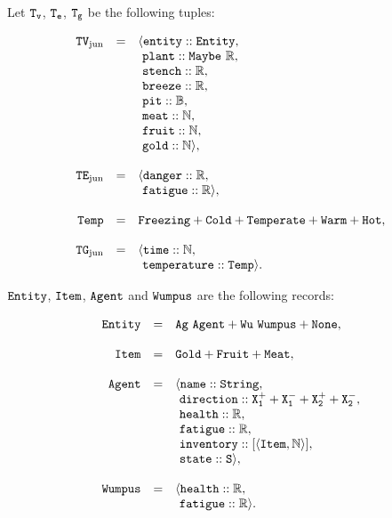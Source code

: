 \begin{definition}[\wjun]
\label{def:wjun}
Let $\mathtt{T_v}$, $\mathtt{T_e}$, $\mathtt{T_g}$ be the following tuples:

$$
	\begin{array}{r c l}
		\type{TV_{\mathrm{jun}}} & = & \langle \field{entity} :: \type{Entity},\\
		           &   & 	   \ \field{plant} :: \type{Maybe\ \R},\\
		           &   &     \ \field{stench} :: \R,\\
		           &   &     \ \field{breeze} :: \R,\\
		           &   &	   \ \field{pit}    :: \B,\\
		           &   &		\ \field{meat}    :: \N,\\
		           &   &		\ \field{fruit}    :: \N,\\
		           &   &	   \ \field{gold}   :: \N \rangle,
		\\
		\\
		\type{TE_{\mathrm{jun}}} & = & \langle \field{danger} :: \R,\\
				   &   &       \ \field{fatigue} :: \R \rangle,
		\\
		\\
		\type{Temp} & = & \type{Freezing} + \type{Cold} + \type{Temperate} + \type{Warm} + \type{Hot},\\
		\\
		\type{TG_{\mathrm{jun}}} & = & \langle \field{time} :: \N,\\
				   &   &       \ \field{temperature} :: \type{Temp} \rangle.
	\end{array}
$$

$\mathtt{Entity}$, $\mathtt{Item}$, $\mathtt{Agent}$ and $\mathtt{Wumpus}$ are the following records:

$$
	\begin{array}{r c l}
		\mathtt{Entity} & = & \mathtt{Ag\ Agent + Wu\ Wumpus + None},\\
		\\
		\mathtt{Item} & = & \mathtt{Gold + Fruit + Meat},\\
		\\
		\mathtt{Agent} & = & \langle \mathtt{name} :: \mathtt{String},\\ 
					 &   & \ \mathtt{direction} :: \mathtt{X_1^+ + X_1^- + X_2^+ + X_2^-},\\
					 &   & \ \mathtt{health} :: \mathbb{R},\\
					 &   & \ \mathtt{fatigue} :: \mathbb{R},\\
					 &   & \ \mathtt{inventory} :: [\mathtt{\langle Item, \mathbb{N} \rangle}],\\
					 &   & \ \mathtt{state} :: \mathtt{S} \rangle,
		\\
		\\
		\mathtt{Wumpus} & = & \langle \mathtt{health} :: \mathbb{R},\\
					  &   & \ \mathtt{fatigue} :: \mathbb{R}\rangle.
	\end{array}
$$


\end{definition}
